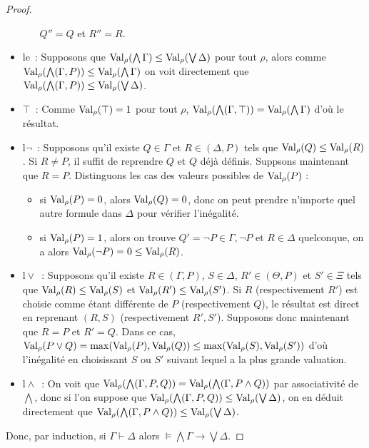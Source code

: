 \begin{proof}
\begin{itemize}
\begin{itemize}
      $Q'' = Q$ et $R'' = R$.
    \end{itemize}
  \item le~: Supposons que
    $\operatorname{Val}_\rho(\bigwedge \Gamma) \leq \operatorname{Val}_\rho(\bigvee \Delta)$ pour tout
    $\rho$, alors comme
    $\operatorname{Val}_\rho(\bigwedge (\Gamma, P)) \leq \operatorname{Val}_\rho(\bigwedge \Gamma)$ on voit
    directement que
    $\operatorname{Val}_\rho(\bigwedge(\Gamma,P)) \leq \operatorname{Val}_\rho(\bigvee\Delta)$.
  \item $\top$~: Comme $\operatorname{Val}_\rho(\top) = 1$ pour tout $\rho$,
    $\operatorname{Val}_\rho(\bigwedge(\Gamma,\top)) = \operatorname{Val}_\rho(\bigwedge \Gamma)$ d'où le
    résultat.
  \item $\mathrm l\lnot$~: Supposons qu'il existe $Q\in\Gamma$ et
    $R\in(\Delta,P)$ tels que $\operatorname{Val}_\rho(Q)\leq\operatorname{Val}_\rho(R)$. Si $R \neq P$, il
    suffit de reprendre $Q$ et $Q$ déjà définis. Suppsons maintenant que
    $R = P$. Distinguons les cas des valeurs possibles de $\operatorname{Val}_\rho(P)$ :
    \begin{itemize}
    \item si $\operatorname{Val}_\rho(P) = 0$, alors $\operatorname{Val}_\rho(Q) = 0$, donc on peut prendre
      n'importe quel autre formule dans $\Delta$ pour vérifier l'inégalité.
    \item si $\operatorname{Val}_\rho(P) = 1$, alors on trouve
      $Q' = \lnot P \in \Gamma,\lnot P$ et $R\in \Delta$ quelconque, on a alors
      $\operatorname{Val}_\rho(\lnot P) = 0 \leq \operatorname{Val}_\rho(R)$.
    \end{itemize}
  \item $\mathrm l\lor$~: Supposons qu'il existe $R\in(\Gamma,P)$, $S\in\Delta$,
    $R'\in(\Theta,P)$ et $S'\in\Xi$ tels que $\operatorname{Val}_\rho(R)\leq\operatorname{Val}_\rho(S)$ et
    $\operatorname{Val}_\rho(R')\leq\operatorname{Val}_\rho(S')$. Si $R$ (respectivement $R'$) est choisie
    comme étant différente de $P$ (respectivement $Q$), le résultat est direct
    en reprenant $(R,S)$ (respectivement $R',S'$). Supposons donc maintenant que
    $R = P$ et $R' = Q$. Dans ce cas,
    $\operatorname{Val}_\rho(P\lor Q) = \max(\operatorname{Val}_\rho(P),\operatorname{Val}_\rho(Q)) \leq \max(\operatorname{Val}_\rho(S),
    \operatorname{Val}_\rho(S'))$ d'où l'inégalité en choisissant $S$ ou $S'$ suivant lequel
    a la plus grande valuation.
  \item $\mathrm l\land$~: On voit que
    $\operatorname{Val}_\rho(\bigwedge(\Gamma,P,Q)) = \operatorname{Val}_\rho(\bigwedge(\Gamma, P \land Q))$
    par associativité de $\bigwedge$, donc si l'on suppose que
    $\operatorname{Val}_\rho(\bigwedge(\Gamma,P,Q)) \leq \operatorname{Val}_\rho(\bigvee\Delta)$, on en
    déduit directement que
    $\operatorname{Val}_\rho(\bigwedge(\Gamma,P\land Q)) \leq\operatorname{Val}_\rho(\bigvee\Delta)$.
  \end{itemize}
  Donc, par induction, si $\Gamma\vdash \Delta$ alors
  $\models \bigwedge\Gamma\to\bigvee\Delta$.
\end{proof}

